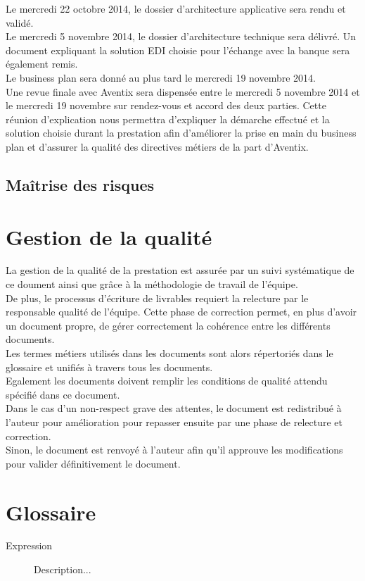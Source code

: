 \documentclass[11pt, a4paper]{article}
\begin{document}
Le mercredi 22 octobre 2014, le dossier d'architecture applicative sera rendu
et validé. \\

Le mercredi 5 novembre 2014, le dossier d'architecture technique sera délivré.
Un document expliquant la solution EDI choisie pour l'échange avec la banque
sera également remis. \\

Le business plan sera donné au plus tard le mercredi 19 novembre 2014. \\

Une revue finale avec Aventix sera dispensée entre le mercredi 5 novembre 2014
et le mercredi 19 novembre sur rendez-vous et accord des deux parties.
Cette réunion d'explication nous permettra d'expliquer la démarche effectué et
la solution choisie durant la prestation afin d'améliorer la prise en main du
business plan et d'assurer la qualité des directives métiers de la part
d'Aventix. \\

\subsection{Maîtrise des risques}

\section{Gestion de la qualité}
La gestion de la qualité de la prestation est assurée par un suivi systématique
de ce doument ainsi que grâce à la méthodologie de travail de l'équipe. \\

De plus, le processus d'écriture de livrables requiert la relecture par le
responsable qualité de l'équipe. Cette phase de correction permet, en plus
d'avoir un document propre, de gérer correctement la cohérence entre les
différents documents. \\

Les termes métiers utilisés dans les documents sont alors répertoriés dans le
glossaire et unifiés à travers tous les documents. \\
Egalement les documents doivent remplir les conditions de qualité attendu
spécifié dans ce document. \\

Dans le cas d'un non-respect grave des attentes, le document est redistribué à
l'auteur pour amélioration pour repasser ensuite par une phase de relecture et
correction. \\
Sinon, le document est renvoyé à l'auteur afin qu'il approuve les modifications
pour valider définitivement le document. \\

\section{Glossaire}

\begin{description}
  \item[Expression] Description...
\end{description}
\end{document}

